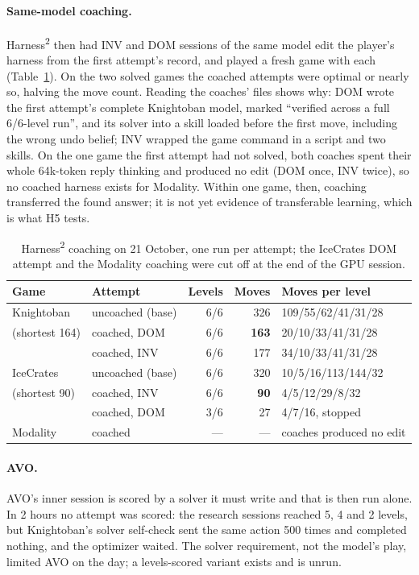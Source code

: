 \documentclass[11pt,a4paper]{article}
\newcommand{\hsq}{Harness\textsuperscript{2}}
\begin{document}
\paragraph{Same-model coaching.}
\hsq{} then had INV and DOM sessions of the same model edit the player's
harness from the first attempt's record, and played a fresh game with each
(Table~\ref{tab:coach}). On the two solved games the coached attempts were
optimal or nearly so, halving the move count. Reading the coaches' files
shows why: DOM wrote the first attempt's complete Knightoban model, marked
``verified across a full 6/6-level run'', and its solver into a skill loaded
before the first move, including the wrong undo belief; INV wrapped the game
command in a script and two skills. On the one game the first attempt had
not solved, both coaches spent their whole 64k-token reply thinking and
produced no edit (DOM once, INV twice), so no coached harness exists for
Modality. Within one game, then, coaching transferred the found answer; it is
not yet evidence of transferable learning, which is what H5 tests.

\begin{table}[htbp]
  \centering\small
  \begin{tabular}{llrrl}
    \toprule
    Game & Attempt & Levels & Moves & Moves per level \\
    \midrule
    Knightoban & uncoached (base) & 6/6 & 326 & 109/55/62/41/31/28 \\
    (shortest 164) & coached, DOM & 6/6 & \textbf{163} & 20/10/33/41/31/28 \\
    & coached, INV & 6/6 & 177 & 34/10/33/41/31/28 \\
    IceCrates & uncoached (base) & 6/6 & 320 & 10/5/16/113/144/32 \\
    (shortest 90) & coached, INV & 6/6 & \textbf{90} & 4/5/12/29/8/32 \\
    & coached, DOM & 3/6 & 27 & 4/7/16, stopped \\
    Modality & coached & --- & --- & coaches produced no edit \\
    \bottomrule
  \end{tabular}
  \caption{\hsq{} coaching on 21 October, one run per attempt; the IceCrates
  DOM attempt and the Modality coaching were cut off at the end of the GPU session.}
  \label{tab:coach}
\end{table}

\paragraph{AVO.}
AVO's inner session is scored by a solver it must write and that is then run
alone. In 2 hours no attempt was scored: the research sessions reached 5, 4
and 2 levels, but Knightoban's solver self-check sent the same action 500
times and completed nothing, and the optimizer waited. The solver requirement,
not the model's play, limited AVO on the day; a levels-scored variant exists
and is unrun.
\end{document}
